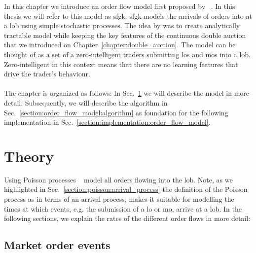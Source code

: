 \documentclass[11pt, a4paper]{thesis}  %
\begin{document}
In this chapter we introduce an order flow model first proposed by \citeauthor{Smith:2003:StatisticalModel}~\cite{Smith:2003:StatisticalModel}. In this thesis we will refer to this model as \ac{sfgk}. \ac{sfgk} models the arrivals of orders into at a \ac{lob} using simple stochastic processes. 
The idea by \citeauthor{Smith:2003:StatisticalModel} was to create analytically tractable model while keeping the key features of the continuous double auction that we introduced on Chapter~\ref{chapter:double_auction}. The model can be thought of as a set of a zero-intelligent traders submitting \acp{lo} and \acp{mo} into a \ac{lob}. Zero-intelligent in this context means that there are no learning features that drive the trader's behaviour.
\\
\\
\noindent The chapter is organized as follows: In Sec.~\ref{section:order_flow_model:theory} we will describe the model in more detail. Subsequently, we will describe the algorithm in Sec.~\ref{section:order_flow_model:algorithm} as foundation for the following implementation in Sec.~\ref{section:implementation:order_flow_model}. 


\section{Theory}
\label{section:order_flow_model:theory}
Using Poisson processes \citeauthor{Smith:2003:StatisticalModel}~\cite{Smith:2003:StatisticalModel, Daniels:2001:storing} model all orders flowing into the \ac{lob}. Note, as we highlighted in Sec.~\ref{section:poisson:arrival_process} the definition of the Poisson process as in terms of an arrival process, makes it suitable for modelling the times at which events, e.g. the submission of a \ac{lo} or \ac{mo}, arrive at a \ac{lob}. In the following sections, we explain the rates of the different order flows in more detail:
	
\subsection{Market order events}
\end{document}
